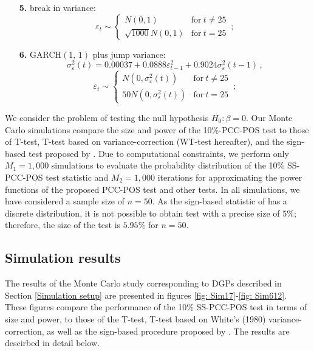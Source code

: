 \documentclass[harvard,11pt]{article}
\begin{document}
\begin{enumerate}
\item[\textbf{5.}] break in variance: 
\begin{equation*}
\varepsilon _{t}\sim \left\{ 
\begin{array}{cc}
N(0,1) & \text{for}\ t\neq 25 \\ 
\sqrt{1000}N(0,1) & \text{for}\ t=25%
\end{array}%
\,;\right.
\end{equation*}%
\item[\textbf{6.}] GARCH$(1,\,1)$ plus jump variance:%
\begin{equation*}
\sigma _{\varepsilon }^{2}(t)=0.00037+0.0888\varepsilon
_{t-1}^{2}+0.9024\sigma _{\varepsilon }^{2}(t-1)\,,
\end{equation*}%
\begin{equation*}
\varepsilon _{t}\sim \left\{ 
\begin{array}{cc}
N(0,\sigma _{\varepsilon }^{2}(t)) & \text{for}\ t\neq 25 \\ 
50N(0,\sigma _{\varepsilon }^{2}(t)) & \text{for}\ t=25%
\end{array}%
\right. \,;
\end{equation*}%
\end{enumerate}
We consider the problem of testing the null hypothesis $H_0: \beta=0$. Our Monte Carlo simulations compare the size and power of the 10\%-PCC-POS test to those of T-test, T-test based on \citet{white1980heteroskedasticity} variance-correction (WT-test hereafter), and the sign-based test proposed by \citet{dufour1995exact}. Due to computational constraints, we perform only $M_1=1,000$ simulations to evaluate the probability distribution of the 10\% SS-PCC-POS test statistic and $M_2=1,000$ iterations for approximating the power functions of the proposed PCC-POS test and other tests. In all simulations, we have considered a sample size of $n=50$. As the sign-based statistic of \citet{dufour1995exact} has a discrete distribution, it is not possible to obtain test with a precise size of $5\%$; therefore, the size of the test is $5.95\%$ for $n=50$. 
\subsection{Simulation results \label{Simulation results}}

The results of the Monte Carlo study corresponding to DGPs described in Section \ref{Simulation setup} are presented in figures \ref{fig: Sim17}-\ref{fig: Sim612}. These figures compare the performance of the 10\% SS-PCC-POS test in terms of size and power, to those of the T-test, T-test based on White's (1980) variance-correction, as well as the sign-based procedure proposed by \citet{dufour2010exact}. The results are descirbed in detail below.
\end{document}
